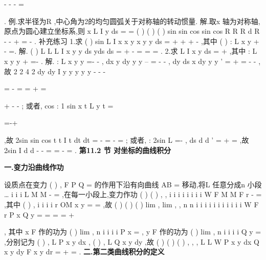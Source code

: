 -
-
-
=




\int 
\int 
\int 
\rho 
. 
\textcolor{lyred}{例}.求半径为R ,中心角为2\alpha 的均匀圆弧关于对称轴的转动惯量. 
解.取x 轴为对称轴,原点为圆心建立坐标系,则
x
L
I
y
ds
\mu 
=
=
\int 
(
)
(
)
(
)
sin
sin
cos
sin
cos
R
R
R
d
R
\alpha 
\alpha 
\mu 
\theta 
\theta 
\theta 
\theta 
\mu \alpha 
\alpha 
\alpha 
-
-
+
=
-
\int 
. 
\textcolor{lyred}{补充练习 }
1.求
(
)
sin
L
I
x
x
y
x
y
y ds
=
+
+
+
-
\int \nabla 
,其中
(
)
:
L x
y
+
-
=. 
解.
(
)
L
L
L
I
x
y
y ds
yds
ds
\pi 
=
+
-
=
=
=
\int 
\int 
\int 
\nabla 
\nabla 
\nabla 
. 
2.求
L
I
x
y ds
=
+
\int \nabla 
,其中
:
L x
y
y
+
=-
. 
解.
:
L x
y
y
=\pm -
-
,
dx
y
dy
y
y
--
=\pm 
-
-
,
dy
ds
x dy
y
y
'
=
+
=
-
-
, 
故
2 2
4 2
dy
dy
I
y
y
y
y
y
-
-
-


=
-
\cdots 
=
=
+
=


+
-
-
\int 
\int 
; 
或者,
cos
:
1 sin
x
t
L
y
t
=


=-+

,故
2sin
sin
cos
t
t
I
t dt
dt
\pi 
\pi 
=
-
\cdots 
=
-
=
\int 
\int 
; 
或者,
:
2sin
L \rho 
\theta 
=-
,
ds
d
d
\rho 
\rho 
\theta 
\theta 
'
=
+
=
,故 
2sin
I
d
d
\pi 
\pi 
\rho 
\theta 
\theta 
\theta 
-
-
=
\cdots 
=
-
\cdots 
=
\int 
\int 
. 
\vspace{6pt}
{\large \bfseries \textcolor{lyred}{第11.2 节 对坐标的曲线积分}}

\vspace{4pt}
{\bfseries \textcolor{lyred}{一.变力沿曲线作功}}

设质点在变力
(
)
,
F
P Q
=
\rho 
的作用下沿有向曲线
\approx 
AB
\Gamma =
移动,将L 任意分成n 小段 
\dots 
i
i
i
L
M
M
-
=
,在每一小段上,变力作功
(
)
(
)
,
,
i
i
i
i
i
i
i
i
W
F
M
M
F
r
\psi \eta 
\psi \eta 
-
\approx 
\cdots 
=
\cdots \Delta 
\xi \xi \xi \xi \xi \xi \xi \rho 
\rho 
\rho 
\rho ,其中 
(
)
,
i
i
i
i
r
OM
x y
=
=
\xi \xi \xi \xi \rho 
\rho 
,故
(
)
(
)
(
)
lim
,
lim
,
,
n
n
i
i
i
i
i
i
i
i
i
i
i
W
F
r
P
x
Q
y
\lambda 
\lambda 
\psi \eta 
\psi \eta 
\psi \eta 
\to 
\to 
=
=
=
\cdots \Delta =
\cdots \Delta 
+
\cdots \Delta 




\sum 
\sum 
\rho 
\rho 
, 
其中
x
F 作的功为
(
)
lim
,
n
i
i
i
i
P
x
\lambda 
\psi \eta 
\to 
=
\cdots \Delta 
\sum 
,
y
F 作的功为
(
)
lim
,
n
i
i
i
i
Q
y
\lambda 
\psi \eta 
\to 
=
\cdots \Delta 
\sum 
,分别记为 
(
)
,
L
P x y dx
\int 
,
(
)
,
L
Q x y dy
\int 
,故
(
)
(
)
(
)
,
,
,
L
L
W
P x y dx
Q x y dy
F x y
dr
=
+
=
\cdots 
\int 
\int 
\rho 
\rho . 
\vspace{4pt}
{\bfseries \textcolor{lyred}{二.第二类曲线积分的定义}}

